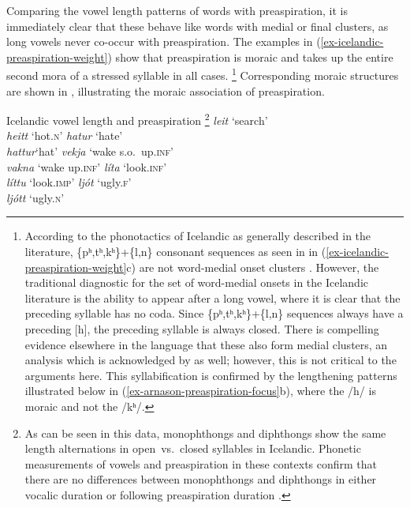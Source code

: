 \documentclass[output=paper,colorlinks,citecolor=brown]{langscibook}
\begin{document}
Comparing the vowel length patterns of words with preaspiration, it is immediately clear that these behave like words with medial or final clusters, as long vowels never co-occur with preaspiration. The examples in (\ref{ex-icelandic-preaspiration-weight}) show that preaspiration is moraic and takes up the entire second mora of a stressed syllable in all cases.%
\footnote{According to the phonotactics of Icelandic as generally described in the literature, \{pʰ,tʰ,kʰ\}+\{l,n\} consonant sequences as seen in  in (\ref{ex-icelandic-preaspiration-weight}c) are not word-medial onset clusters \citep[e.g.,][]{arnason2011}. However, the traditional diagnostic for the set of word-medial onsets in the Icelandic literature is the ability to appear after a long vowel, where it is clear that the preceding syllable has no coda. Since \{pʰ,tʰ,kʰ\}+\{l,n\} sequences always have a preceding [h], the preceding syllable is always closed. There is compelling evidence elsewhere in the language that these also form medial clusters, an analysis which is acknowledged by \citet[172]{arnason2011} as well; however, this is not critical to the arguments here. This syllabification is confirmed by the lengthening patterns illustrated below in (\ref{ex-arnason-preaspiration-focus}b), where the /h/ is moraic and not the /kʰ/.} 
Corresponding moraic structures are shown in , illustrating the moraic association of preaspiration.

\ea Icelandic vowel length and preaspiration \citep{thrainsson1978,arnason2011}\footnote{As can be seen in this data, monophthongs and diphthongs show the same length alternations in open~vs.~closed syllables in Icelandic. Phonetic measurements of vowels and preaspiration in these contexts confirm that there are no differences between monophthongs and diphthongs in either vocalic duration or following preaspiration duration \citep{garnes1976,thrainsson1978}.}
\label{ex-icelandic-preaspiration-weight}
	\ea	{} 
		 \textit{leit}	\tab\relax [leiːt]	    \tab `search'\\
	     \textit{heitt}	\tab\relax [heiht]		\tab `hot.\textsc{n}'
	\ex	 \textit{hatur} \tab{}	\tab `hate'\\
	     \textit{hattur}\tab{}	\tab `hat'
	\ex	 \textit{vekja}	\tab{}	\tab `wake s.o.\ up.\textsc{inf}'\\
	     \textit{vakna}	\tab{}	\tab `wake up.\textsc{inf}'
	\ex	 \textit{líta}  \tab{}	\tab `look.\textsc{inf}'\\
	     \textit{líttu}	\tab\relax [lih.tʏ]	    \tab `look.\textsc{imp}'
	\ex	 \textit{ljót}  \tab\relax [ljouːt]	    \tab `ugly.\textsc{f}'	\\
	     \textit{ljótt}	\tab\relax [ljouht]	    \tab `ugly.\textsc{n}'
    \z
\z
\end{document}
